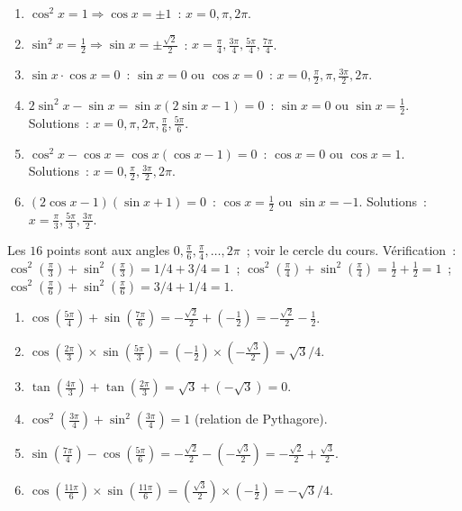 
\begin{enumerate}
  \item $\cos^2x=1\Rightarrow\cos x=\pm1$~: $x=0,\pi,2\pi$.
  \item $\sin^2x=\frac{1}{2}\Rightarrow\sin x=\pm\frac{\sqrt{2}}{2}$~: $x=\frac{\pi}{4},\frac{3\pi}{4},\frac{5\pi}{4},\frac{7\pi}{4}$.
  \item $\sin x\cdot\cos x=0$~: $\sin x=0$ ou $\cos x=0$~: $x=0,\frac{\pi}{2},\pi,\frac{3\pi}{2},2\pi$.
  \item $2\sin^2x-\sin x=\sin x(2\sin x-1)=0$~: $\sin x=0$ ou $\sin x=\frac{1}{2}$.
        Solutions~: $x=0,\pi,2\pi,\frac{\pi}{6},\frac{5\pi}{6}$.
  \item $\cos^2x-\cos x=\cos x(\cos x-1)=0$~: $\cos x=0$ ou $\cos x=1$.
        Solutions~: $x=0,\frac{\pi}{2},\frac{3\pi}{2},2\pi$.
  \item $(2\cos x-1)(\sin x+1)=0$~: $\cos x=\frac{1}{2}$ ou $\sin x=-1$.
        Solutions~: $x=\frac{\pi}{3},\frac{5\pi}{3},\frac{3\pi}{2}$.
\end{enumerate}


Les $16$ points sont aux angles $0, \frac{\pi}{6}, \frac{\pi}{4}, \ldots, 2\pi$~; voir le cercle du cours.
V\'erification~: $\cos^2(\frac{\pi}{3})+\sin^2(\frac{\pi}{3})=1/4+3/4=1$~;\checkmark
$\cos^2(\frac{\pi}{4})+\sin^2(\frac{\pi}{4})=\frac{1}{2}+\frac{1}{2}=1$~;\checkmark
$\cos^2(\frac{\pi}{6})+\sin^2(\frac{\pi}{6})=3/4+1/4=1$.\checkmark


\begin{enumerate}
  \item $\cos(\frac{5\pi}{4})+\sin(\frac{7\pi}{6})=-\frac{\sqrt{2}}{2}+(-\frac{1}{2})=-\frac{\sqrt{2}}{2}-\frac{1}{2}$.
  \item $\cos(\frac{2\pi}{3})\times\sin(\frac{5\pi}{3})=(-\frac{1}{2})\times(-\frac{\sqrt{3}}{2})=\sqrt{3}/4$.
  \item $\tan(\frac{4\pi}{3})+\tan(\frac{2\pi}{3})=\sqrt{3}+(-\sqrt{3})=0$.
  \item $\cos^2(\frac{3\pi}{4})+\sin^2(\frac{3\pi}{4})=1$ (relation de Pythagore).
  \item $\sin(\frac{7\pi}{4})-\cos(\frac{5\pi}{6})=-\frac{\sqrt{2}}{2}-(-\frac{\sqrt{3}}{2})=-\frac{\sqrt{2}}{2}+\frac{\sqrt{3}}{2}$.
  \item $\cos(\frac{11\pi}{6})\times\sin(\frac{11\pi}{6})=(\frac{\sqrt{3}}{2})\times(-\frac{1}{2})=-\sqrt{3}/4$.
\end{enumerate}

